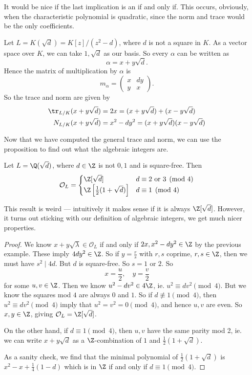 \documentclass[a4paper]{article}
\begin{document}
It would be nice if the last implication is an if and only if. This occurs, obviously, when the characteristic polynomial is quadratic, since the norm and trace would be the only coefficients.
\begin{eg}
  Let $L = K(\sqrt{d}) = K[z]/(z^2 - d)$, where $d$ is not a square in $K$. As a vector space over $K$, we can take $1, \sqrt{d}$ as our basis. So every $\alpha$ can be written as
  \[
    \alpha = x + y\sqrt{d}.
  \]
  Hence the matrix of multiplication by $\alpha$ is
  \[
    m_\alpha =
    \begin{pmatrix}
      x & dy\\
      y & x
    \end{pmatrix}.
  \]
  So the trace and norm are given by
  \begin{align*}
    \tr_{L/K} (x + y\sqrt{d}) &= 2x = (x + y\sqrt{d}) + (x - y\sqrt{d})\\
    N_{L/K} (x + y \sqrt{d}) &= x^2 - dy^2 = (x + y\sqrt{d})(x- y\sqrt{d})
  \end{align*}
\end{eg}

Now that we have computed the general trace and norm, we can use the proposition to find out what the algebraic integers are.
\begin{lemma}
  Let $L = \Q(\sqrt{d})$, where $d \in \Z$ is not $0, 1$ and is square-free. Then
  \[
    \mathcal{O}_L =
    \begin{cases}
      \Z[\sqrt{d}] & d \equiv 2 \text{ or }3\pmod 4\\
      \Z\left[\frac{1}{2}(1 + \sqrt{d})\right] & d \equiv 1 \pmod 4
    \end{cases}
  \]
\end{lemma}
This result is weird --- intuitively it makes sense if it is always $\Z[\sqrt{d}]$. However, it turns out sticking with our definition of algebraic integers, we get much nicer properties.

\begin{proof}
  We know $x + y \sqrt{\lambda} \in \mathcal{O}_L$ if and only if $2x, x^2 - dy^2 \in \Z$ by the previous example. These imply $4dy^2 \in \Z$. So if $y = \frac{r}{s}$ with $r, s$ coprime, $r, s \in \Z$, then we must have $s^2 \mid 4d$. But $d$ is square-free. So $s = 1$ or $2$. So
  \[
    x = \frac{u}{2},\quad y = \frac{v}{2}
  \]
  for some $u, v \in \Z$. Then we know $u^2 - dv^2 \in 4\Z$, ie. $u^2 \equiv dv^2 \pmod 4$. But we know the squares mod $4$ are always $0$ and $1$. So if $d \not\equiv 1 \pmod 4$, then $u^2 \equiv dv^2\pmod 4$ imply that $u^2 = v^2 = 0\pmod 4$, and hence $u, v$ are even. So $x, y \in \Z$, giving $\mathcal{O}_L = \Z[\sqrt{d}]$.

  On the other hand, if $d \equiv 1\pmod 4$, then $u, v$ have the same parity mod 2, ie. we can write $x + y\sqrt{d}$ as a $\Z$-combination of $1$ and $\frac{1}{2}(1 + \sqrt{d})$.

  As a sanity check, we find that the minimal polynomial of $\frac{1}{2}(1 + \sqrt{d})$ is $x^2 - x + \frac{1}{4}(1 - d)$ which is in $\Z$ if and only if $d \equiv 1 \pmod 4$.
\end{proof}
\end{document}
